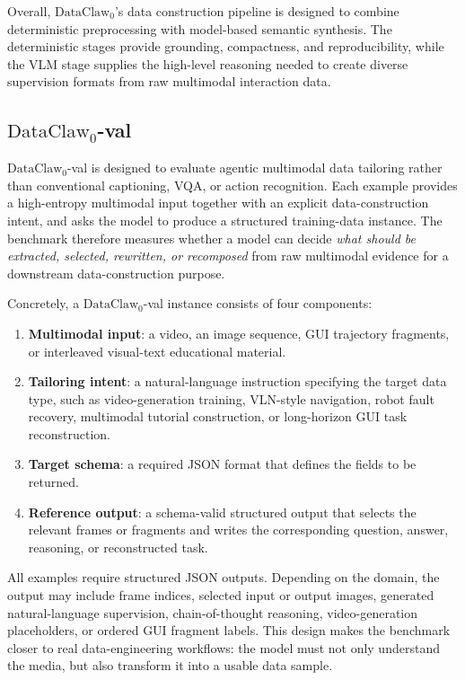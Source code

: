 \documentclass{llmxive}
\begin{document}
Overall, $\text{DataClaw}_0$'s data construction pipeline is designed to combine deterministic preprocessing with model-based semantic synthesis. The deterministic stages provide grounding, compactness, and reproducibility, while the VLM stage supplies the high-level reasoning needed to create diverse supervision formats from raw multimodal interaction data.

\subsection{\texorpdfstring{$\text{DataClaw}_0$}{DataClaw0}-val}
\label{app:benchmark}
$\text{DataClaw}_0$-val is designed to evaluate agentic multimodal data tailoring rather than conventional captioning, VQA, or action recognition. Each example provides a high-entropy multimodal input together with an explicit data-construction intent, and asks the model to produce a structured training-data instance. The benchmark therefore measures whether a model can decide \emph{what should be extracted, selected, rewritten, or recomposed} from raw multimodal evidence for a downstream data-construction purpose.

Concretely, a $\text{DataClaw}_0$-val instance consists of four components:
\begin{enumerate}
    \item \textbf{Multimodal input}: a video, an image sequence, GUI trajectory fragments, or interleaved visual-text educational material.
    \item \textbf{Tailoring intent}: a natural-language instruction specifying the target data type, such as video-generation training, VLN-style navigation, robot fault recovery, multimodal tutorial construction, or long-horizon GUI task reconstruction.
    \item \textbf{Target schema}: a required JSON format that defines the fields to be returned.
    \item \textbf{Reference output}: a schema-valid structured output that selects the relevant frames or fragments and writes the corresponding question, answer, reasoning, or reconstructed task.
\end{enumerate}

All examples require structured JSON outputs. Depending on the domain, the output may include frame indices, selected input or output images, generated natural-language supervision, chain-of-thought reasoning, video-generation placeholders, or ordered GUI fragment labels. This design makes the benchmark closer to real data-engineering workflows: the model must not only understand the media, but also transform it into a usable data sample.
\end{document}
